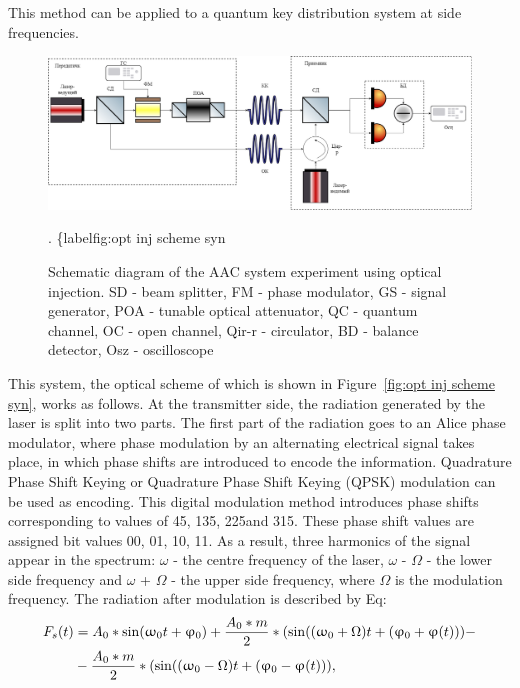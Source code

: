 {This method can be applied to a quantum key distribution system at side frequencies.
\begin{figure}
    \centering
    \includegraphics[width=\textwidth]{images/Схема с обратной связью.png}
    \caption{Schematic diagram of the AAC system experiment using optical injection. SD - beam splitter, FM - phase modulator, GS - signal generator, POA - tunable optical attenuator, QC - quantum channel, OC - open channel, Qir-r - circulator, BD - balance detector, Osz - oscilloscope}.
    \{label{fig:opt inj scheme syn}
\end{figure}
This system, the optical scheme of which is shown in Figure~\ref{fig:opt inj scheme syn}, works as follows. At the transmitter side, the radiation generated by the laser is split into two parts. The first part of the radiation goes to an Alice phase modulator, where phase modulation by an alternating electrical signal takes place, in which phase shifts are introduced to encode the information. Quadrature Phase Shift Keying or Quadrature Phase Shift Keying (QPSK) modulation can be used as encoding. This digital modulation method introduces phase shifts corresponding to values of 45\textdegree, 135\textdegree, 225\textdegree and 315\textdegree. These phase shift values are assigned bit values {00, 01, 10, 11}. As a result, three harmonics of the signal appear in the spectrum: $\omega$ - the centre frequency of the laser, $\omega$ - $\Omega$ - the lower side frequency and $\omega$ + $\Omega$ - the upper side frequency, where $\Omega$ is the modulation frequency. The radiation after modulation is described by Eq:
\begin{align}
\label{eq:spectrum seed}
F_s(t) & = A_0 * \sin(\omega_0 t + \phi_0) + \frac{A_0 * m}{2} * (\sin((\omega_0 + \Omega)t + (\phi_0 + \phi (t))) - \notag \\\
&- \frac{A_0 * m}{2} * (\sin((\omega_0 - \Omega)t + (\phi_0 - \phi (t))),

\end{align}}
